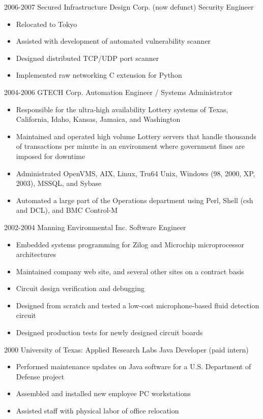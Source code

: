 \documentclass[]{friggeri-cv}
\begin{document}
\begin{entrylist}
{    }
  \entry
    {2006-2007}
    {Secured Infrastructure Design Corp. (now defunct)}
    {Security Engineer}
    {
      \begin{itemize}
        \item{Relocated to Tokyo}
        \item{Assisted with development of automated vulnerability scanner}
        \item{Designed distributed TCP/UDP port scanner}
        \item{Implemented raw networking C extension for Python}
      \end{itemize}
    }
  \entry
    {2004-2006}
    {GTECH Corp.}
    {Automation Engineer / Systems Administrator}
    {
      \begin{itemize}
      \item{Responsible for the ultra-high availability Lottery systems of Texas, California, Idaho, Kansas, Jamaica, and Washington}
      \item{Maintained and operated high volume Lottery servers that handle thousands of transactions per minute in an environment where government fines are imposed for downtime}
      \item{Administrated OpenVMS, AIX, Linux, Tru64  Unix, Windows (98, 2000, XP, 2003), MSSQL, and Sybase}
      \item{Automated a large part of the Operations department using Perl, Shell (csh and DCL), and BMC Control-M}
      \end{itemize}
    }
  \entry
    {2002-2004}
    {Manning Environmental Inc.}
    {Software Engineer}
    {
      \begin{itemize}
      \item{Embedded systems programming for Zilog and Microchip microprocessor architectures}
      \item{Maintained company web site, and several other sites on a contract basis}
      \item{Circuit design verification and debugging}
      \item{Designed from scratch and tested a low-cost microphone-based fluid detection circuit}
      \item{Designed production tests for newly designed circuit boards}
      \end{itemize}
    }
  \entry
    {2000}
    {University of Texas: Applied Research Labs}
    {Java Developer (paid intern)}
    {
      \begin{itemize}
      \item{Performed maintenance updates on Java software for a U.S. Department of Defense project}
      \item{Assembled and installed new employee PC workstations}
      \item{Assisted staff with physical labor of office relocation}
      \end{itemize}
    }
\end{entrylist}
\end{document}
